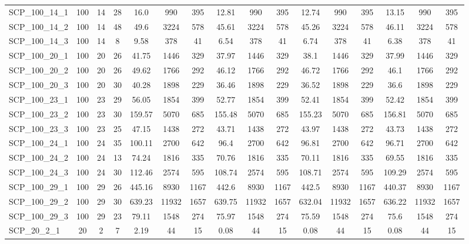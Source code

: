 \begin{sidewaystable}[!ht]
{\begin{tabular}{lccccccccccccccc}
SCP\_100\_14\_1 & 100 & 14 & 28 & 16.0 & 990 & 395 & 12.81 & 990 & 395 &  \textcolor{blue2}{12.74} & 990 & 395 & 13.15 & 990 & 395 \\
SCP\_100\_14\_2 & 100 & 14 & 48 & 49.6 & 3224 & 578 & 45.61 & 3224 & 578 & 45.26 & 3224 & 578 & 46.11 & 3224 & 578 \\
SCP\_100\_14\_3 & 100 & 14 & 8 & 9.58 & 378 & 41 & 6.54 & 378 & 41 & 6.74 & 378 & 41 & 6.38 & 378 & 41 \\
SCP\_100\_20\_1 & 100 & 20 & 26 & 41.75 & 1446 & 329 & 37.97 & 1446 & 329 & 38.1 & 1446 & 329 & 37.99 & 1446 & 329 \\
SCP\_100\_20\_2 & 100 & 20 & 26 & 49.62 & 1766 & 292 & 46.12 & 1766 & 292 & 46.72 & 1766 & 292 & 46.1 & 1766 & 292 \\
SCP\_100\_20\_3 & 100 & 20 & 30 & 40.28 & 1898 & 229 &  \textcolor{blue2}{36.46} & 1898 & 229 & 36.52 & 1898 & 229 & 36.6 & 1898 & 229 \\
SCP\_100\_23\_1 & 100 & 23 & 29 & 56.05 & 1854 & 399 & 52.77 & 1854 & 399 & 52.41 & 1854 & 399 & 52.42 & 1854 & 399 \\
SCP\_100\_23\_2 & 100 & 23 & 30 & 159.57 & 5070 & 685 & 155.48 & 5070 & 685 & 155.23 & 5070 & 685 & 156.81 & 5070 & 685 \\
SCP\_100\_23\_3 & 100 & 23 & 25 & 47.15 & 1438 & 272 & 43.71 & 1438 & 272 & 43.97 & 1438 & 272 & 43.73 & 1438 & 272 \\
SCP\_100\_24\_1 & 100 & 24 & 35 & 100.11 & 2700 & 642 & 96.4 & 2700 & 642 & 96.81 & 2700 & 642 & 96.71 & 2700 & 642 \\
SCP\_100\_24\_2 & 100 & 24 & 13 & 74.24 & 1816 & 335 & 70.76 & 1816 & 335 & 70.11 & 1816 & 335 &  \textcolor{blue2}{69.55} & 1816 & 335 \\
SCP\_100\_24\_3 & 100 & 24 & 30 & 112.46 & 2574 & 595 & 108.74 & 2574 & 595 & 108.71 & 2574 & 595 & 109.29 & 2574 & 595 \\
SCP\_100\_29\_1 & 100 & 29 & 26 & 445.16 & 8930 & 1167 & 442.6 & 8930 & 1167 & 442.5 & 8930 & 1167 & 440.37 & 8930 & 1167 \\
SCP\_100\_29\_2 & 100 & 29 & 30 & 639.23 & 11932 & 1657 & 639.75 & 11932 & 1657 & 632.04 & 11932 & 1657 & 636.22 & 11932 & 1657 \\
SCP\_100\_29\_3 & 100 & 29 & 23 & 79.11 & 1548 & 274 & 75.97 & 1548 & 274 & 75.59 & 1548 & 274 & 75.6 & 1548 & 274 \\
SCP\_20\_2\_1 & 20 & 2 & 7 & 2.19 & 44 & 15 &  \textcolor{blue2}{0.08} & 44 & 15 &  \textcolor{blue2}{0.08} & 44 & 15 &  \textcolor{blue2}{0.08} & 44 & 15 \\

\end{tabular}}
\end{sidewaystable}
